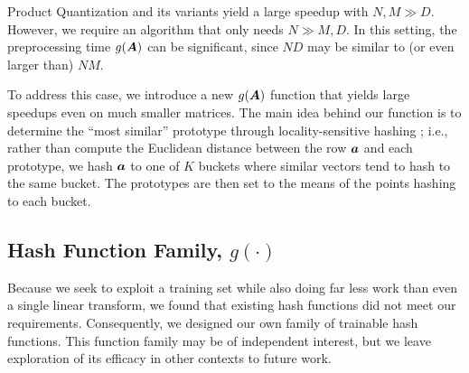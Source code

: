 

Product Quantization and its variants yield a large speedup with $N, M \gg D$. However, we require an algorithm that only needs $N \gg M, D$. In this setting, the preprocessing time $g(\bm{A})$ can be significant, since $ND$ may be similar to (or even larger than) $NM$.

To address this case, we introduce a new $g(\bm{A})$ function that yields large speedups even on much smaller matrices. %
The main idea behind our function is to determine the ``most similar'' prototype through locality-sensitive hashing \cite{lshOrig}; i.e., rather than compute the Euclidean distance between the row $\bm{a}$ and each prototype, we hash $\bm{a}$ to one of $K$ buckets where similar vectors tend to hash to the same bucket. The prototypes are then set to the means of the points hashing to each bucket.%


\subsection{Hash Function Family, $g(\cdot)$}

Because we seek to exploit a training set while also doing far less work than even a single linear transform, we found that existing hash functions did not meet our requirements. Consequently, we designed our own family of trainable hash functions. This function family may be of independent interest, but we leave exploration of its efficacy in other contexts to future work. %

